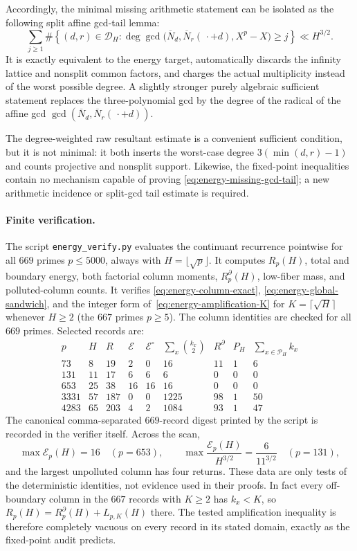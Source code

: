 Accordingly, the minimal missing arithmetic statement can be isolated as
the following split affine gcd-tail lemma:
\begin{equation}\label{eq:energy-missing-gcd-tail}
 \boxed{
 \sum_{j\geq1}
 \#\left\{(d,r)\in\mathscr D_H:
 \deg\gcd\bigl(\overline N_d,\overline N_r(\,\cdot+d),X^p-X\bigr)
 \geq j\right\}
 \ll H^{3/2}.}
\end{equation}
It is exactly equivalent to the energy target, automatically discards
the infinity lattice and nonsplit common factors, and charges the actual
multiplicity instead of the worst possible degree.  A slightly stronger
purely algebraic sufficient statement replaces the three-polynomial gcd
by the degree of the radical of the affine gcd
$\gcd(\overline N_d,\overline N_r(\,\cdot+d))$.

The degree-weighted raw resultant estimate is a convenient sufficient
condition, but it is not minimal: it both inserts the worst-case degree
$3(\min(d,r)-1)$ and counts projective and nonsplit support.  Likewise,
the fixed-point inequalities contain no mechanism capable of proving
\eqref{eq:energy-missing-gcd-tail}; a new arithmetic incidence or
split-gcd tail estimate is required.

\paragraph{Finite verification.}
The script \texttt{energy\_verify.py} evaluates the continuant recurrence
pointwise for all $669$ primes $p\leq5000$, always with
$H=\lfloor\sqrt p\rfloor$.  It computes $R_p(H)$, total and boundary
energy, both factorial column moments, $R_p^\partial(H)$, low-fiber mass,
and polluted-column counts.  It verifies
\eqref{eq:energy-column-exact}, \eqref{eq:energy-global-sandwich}, and
the integer form of~\eqref{eq:energy-amplification-K} for
$K=\lceil\sqrt H\rceil$ whenever $H\geq2$ (the $667$ primes $p\geq5$).
The column identities are checked for all $669$ primes.  Selected records
are:
\[
\begin{array}{c|r|r|r|r|r|r|r|r}
p&H&R&\mathcal E&\mathcal E^\circ&
 \sum_x\binom{k_x}{2}&R^\partial&P_H&
 \sum_{x\in\mathcal P_H}k_x\\ \hline
73&8&19&2&0&16&11&1&6\\
131&11&17&6&6&6&0&0&0\\
653&25&38&16&16&16&0&0&0\\
3331&57&187&0&0&1225&98&1&50\\
4283&65&203&4&2&1084&93&1&47
\end{array}
\]
The canonical comma-separated $669$-record digest printed by the script
is recorded in the verifier itself.  Across the scan,
\[
 \max\mathcal E_p(H)=16\quad(p=653),
 \qquad
 \max\frac{\mathcal E_p(H)}{H^{3/2}}
 =\frac6{11^{3/2}}\quad(p=131),
\]
and the largest unpolluted column has four returns.  These data are only
tests of the deterministic identities, not evidence used in their proofs.
In fact every off-boundary column in the $667$ records with $K\geq2$ has
$k_x<K$, so $R_p(H)=R_p^\partial(H)+L_{p,K}(H)$ there.  The tested
amplification inequality is therefore completely vacuous on every record
in its stated domain, exactly as the fixed-point audit predicts.

